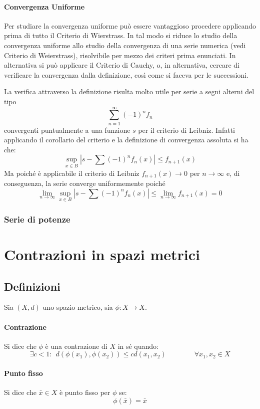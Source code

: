 \documentclass[a4paper,12pt]{article}
\begin{document}
\paragraph*{Convergenza Uniforme}
Per studiare la convergenza uniforme può essere vantaggioso procedere applicando prima di tutto il Criterio di Wierstrass. In tal modo si riduce lo studio della convergenza uniforme allo studio della convergenza di una serie numerica (vedi Criterio di Weierstrass), risolvibile per mezzo dei criteri prima enunciati. In alternativa si può applicare il Criterio di Cauchy, o, in alternativa, cercare di verificare la convergenza dalla definizione, così come si faceva per le successioni. 

La verifica attraverso la definizione risulta molto utile per serie a segni alterni del tipo
$$\sum_{n=1}^{\infty}(-1)^n f_n$$
convergenti puntualmente a una funzione $s$ per il criterio di Leibniz. Infatti applicando il corollario del criterio e la definizione di convergenza assoluta si ha che:
$$\sup_{x\in B}\left|s- \sum (-1)^n f_n(x)  \right|\leq f_{n+1}(x)$$
Ma poiché è applicabile il criterio di Leibniz $f_{n+1}(x)\to0$ per $n\to\infty$ e, di conseguenza, la serie converge uniformemente poiché
$$\lim_{n\to\infty}\sup_{x\in B}\left|s- \sum (-1)^n f_n(x)  \right|\leq \lim_{n\to\infty} f_{n+1}(x)=0$$
\subsubsection{Serie di potenze}


\section{Contrazioni in spazi metrici}
\subsection{Definizioni}
Sia $(X, d)$ uno spazio metrico, sia $\phi : X\rightarrow X$.
\paragraph{Contrazione}
Si dice che $\phi$ è una contrazione di $X$ in sé quando:
$$\exists c < 1:\ \ d(\phi(x_1), \phi(x_2)) \leq cd(x_1, x_2)\qquad\qquad\forall x_1, x_2 \in X$$
\paragraph{Punto fisso}
Si dice che $\bar{x}\in X$ è punto fisso per $\phi$ se:
$$\phi(\bar{x})=\bar{x}$$
\end{document}
